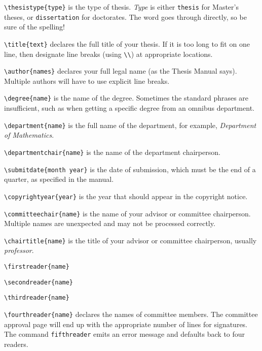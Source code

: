 \begin{description}

\item \verb|\thesistype{type}|
is the type of thesis. {\em Type\/} is either \verb|thesis| for Master's
theses, or \verb|dissertation| for doctorates. The word goes through
directly, so be sure of the spelling!

\item \verb|\title{text}|
declares the full title of your thesis. If it is too long to fit on one
line, then designate line breaks (using \verb|\\|) at appropriate
locations.

\item \verb|\author{names}| declares your full legal name (as the Thesis
Manual says). Multiple authors will have to use explicit line breaks.

\item \verb|\degree{name}| is the name of the degree. Sometimes the
standard phrases are insufficient, such as when getting a specific
degree from an omnibus department.

\item \verb|\department{name}| is the full name of the department, for
example, {\em Department of Mathematics}.

\item \verb|\departmentchair{name}| is the name of the department
chairperson.

\item \verb|\submitdate{month year}| is the date of submission, which
must be the end of a quarter, as specified in the manual.

\item \verb|\copyrightyear{year}| is the year that should appear in the
copyright notice.

\item \verb|\committeechair{name}| is the name of your advisor or
committee chairperson. Multiple names are unexpected and may not be
processed correctly.

\item \verb|\chairtitle{name}| is the title of your advisor or
committee chairperson, usually {\em professor}.

\item \verb|\firstreader{name}|
\item \verb|\secondreader{name}|
\item \verb|\thirdreader{name}|
\item \verb|\fourthreader{name}|
declares the names of committee members. The committee approval page
will end up with the appropriate number of lines for signatures.
The command \verb|fifthreader| emits an error message and defaults back
to four readers.


\end{description}
